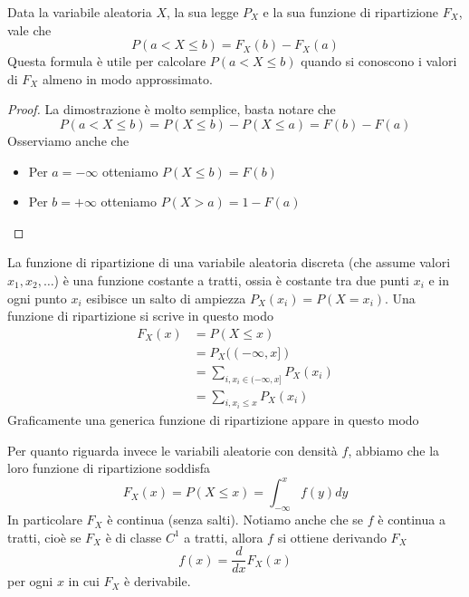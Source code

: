 \begin{theorem}
	Data la variabile aleatoria $X$, la sua legge $P_X$ e la sua funzione di ripartizione $F_X$, vale
	che
	\[ P(a < X \leq b) = F_X (b) - F_X(a) \]
	Questa formula è utile per calcolare $P(a < X \leq b)$ quando si conoscono i valori di $F_X$
	almeno in modo approssimato.
	\begin{proof}
		La dimostrazione è molto semplice, basta notare che
		\[ P(a < X \leq b) = P(X \leq b) - P(X \leq a) = F(b) - F(a) \]
		Osserviamo anche che
		\begin{itemize}
			\item Per $a = -\infty$ otteniamo $P(X \leq b) = F(b)$
			\item Per $b = +\infty$ otteniamo $P(X > a) = 1 - F(a)$
		\end{itemize}
	\end{proof}
\end{theorem}

La funzione di ripartizione di una variabile aleatoria discreta (che assume valori
$x_1, x_2, \dots$) è una funzione costante a tratti, ossia è costante tra due punti $x_i$ e in ogni
punto $x_i$ esibisce un salto di ampiezza $P_X(x_i) = P(X = x_i)$. Una funzione di ripartizione
si scrive in questo modo
\begin{align*}
	F_X(x) & = P(X \leq x)                              \\
	       & = P_X ((-\infty, x])                       \\
	       & = \sum_{i, x_i \in (-\infty, x]} P_X (x_i) \\
	       & = \sum_{i, x_i \leq x} P_X (x_i)
\end{align*}
Graficamente una generica funzione di ripartizione appare in questo modo
\begin{center}
\end{center}
Per quanto riguarda invece le variabili aleatorie con densità $f$, abbiamo che la loro funzione di
ripartizione soddisfa
\[ F_X(x) = P(X \leq x) = \int_{-\infty}^x f(y) dy \]
In particolare $F_X$ è continua (senza salti). Notiamo anche che se $f$ è continua a tratti, cioè
se $F_X$ è di classe $C^1$ a tratti, allora $f$ si ottiene derivando $F_X$
\[ f(x) = \frac{d}{dx} F_X (x) \]
per ogni $x$ in cui $F_X$ è derivabile.

